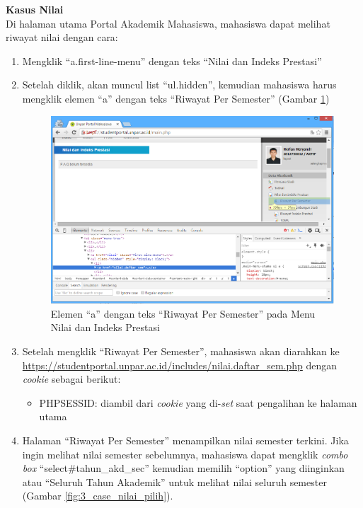 \documentclass[a4paper,twoside]{article}
\begin{document}
\begin{enumerate}
\begin{enumerate}
\textbf{Kasus Nilai}\\
Di halaman utama Portal Akademik Mahasiswa, mahasiswa dapat melihat riwayat nilai dengan cara:
\begin{enumerate}
	\item Mengklik ``a.first-line-menu'' dengan teks ``Nilai dan Indeks Prestasi'' 
	\item Setelah diklik, akan muncul list ``ul.hidden'', kemudian mahasiswa harus mengklik elemen ``a'' dengan teks ``Riwayat Per Semester'' (Gambar \ref{fig:3_case_nilai_menu})
	\begin{figure}[H]
			\centering
			\includegraphics[scale=0.5]{Gambar/case-nilai-menu}
			\caption{Elemen ``a'' dengan teks ``Riwayat Per Semester'' pada Menu Nilai dan Indeks Prestasi} 
			\label{fig:3_case_nilai_menu}
		\end{figure}
		\item Setelah mengklik ``Riwayat Per Semester'', mahasiswa akan diarahkan ke \url{https://studentportal.unpar.ac.id/includes/nilai.daftar_sem.php} dengan \textit{cookie} sebagai berikut:
\begin{itemize}
	\item PHPSESSID: diambil dari \textit{cookie} yang di-\textit{set} saat pengalihan ke halaman utama
\end{itemize}
		\item Halaman ``Riwayat Per Semester'' menampilkan nilai semester terkini. Jika ingin melihat nilai semester sebelumnya, mahasiswa dapat mengklik \textit{combo box} ``select\#tahun\_akd\_sec'' kemudian memilih ``option'' yang diinginkan atau ``Seluruh Tahun Akademik'' untuk melihat nilai seluruh semester (Gambar \ref{fig:3_case_nilai_pilih}).
		

\end{enumerate}
\end{enumerate}
\end{enumerate}
\end{document}
